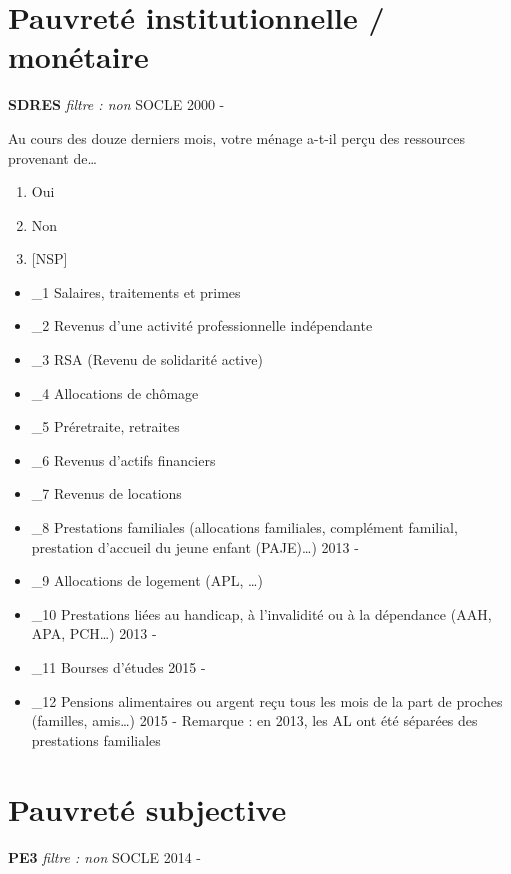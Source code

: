 \documentclass[12pt,a4paper]{reedthesis}
\providecommand{\tightlist}{%
  \setlength{\itemsep}{0pt}\setlength{\parskip}{0pt}}
\begin{document}
\hypertarget{pauvretuxe9-institutionnelle-monuxe9taire}{%
\section{Pauvreté institutionnelle / monétaire}\label{pauvretuxe9-institutionnelle-monuxe9taire}}

\textbf{SDRES} \emph{filtre : non} SOCLE 2000 -

Au cours des douze derniers mois, votre ménage a-t-il perçu des ressources provenant de\ldots{}
\begin{enumerate}
\def\labelenumi{\arabic{enumi}.}
\tightlist
\item
  Oui
\item
  Non
\item
  {[}NSP{]}
\end{enumerate}
\begin{itemize}
\tightlist
\item
  \_1 Salaires, traitements et primes
\item
  \_2 Revenus d'une activité professionnelle indépendante
\item
  \_3 RSA (Revenu de solidarité active)
\item
  \_4 Allocations de chômage
\item
  \_5 Préretraite, retraites
\item
  \_6 Revenus d'actifs financiers
\item
  \_7 Revenus de locations
\item
  \_8 Prestations familiales (allocations familiales, complément familial, prestation d'accueil du jeune enfant (PAJE)\ldots) 2013 -
\item
  \_9 Allocations de logement (APL, \ldots)
\item
  \_10 Prestations liées au handicap, à l'invalidité ou à la dépendance (AAH, APA, PCH\ldots) 2013 -
\item
  \_11 Bourses d'études 2015 -
\item
  \_12 Pensions alimentaires ou argent reçu tous les mois de la part de proches (familles, amis\ldots) 2015 -
  Remarque : en 2013, les AL ont été séparées des prestations familiales
\end{itemize}
\hypertarget{pauvretuxe9-subjective-1}{%
\section{Pauvreté subjective}\label{pauvretuxe9-subjective-1}}

\textbf{PE3} \emph{filtre : non} SOCLE 2014 -
\end{document}
